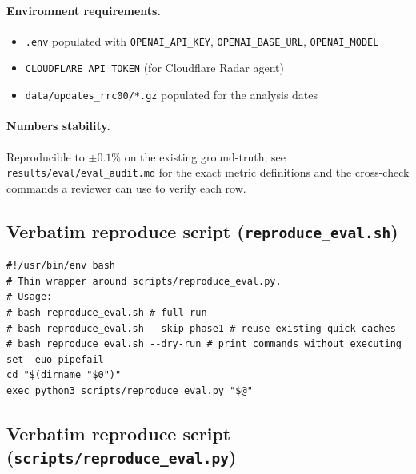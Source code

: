 \documentclass[sigcomm,nonatbib]{acmart}
\begin{document}
\paragraph{Environment requirements.}
\begin{itemize}
\item \texttt{.env} populated with \texttt{OPENAI\_API\_KEY},
\texttt{OPENAI\_BASE\_URL}, \texttt{OPENAI\_MODEL}
\item \texttt{CLOUDFLARE\_API\_TOKEN} (for Cloudflare Radar agent)
\item \texttt{data/updates\_rrc00/*.gz} populated for the analysis
dates
\end{itemize}

\paragraph{Numbers stability.} Reproducible to $\pm 0.1\%$ on the
existing ground-truth; see \texttt{results/eval/eval\_audit.md} for
the exact metric definitions and the cross-check commands a reviewer
can use to verify each row.

\subsection{Verbatim reproduce script (\texttt{reproduce\_eval.sh})}

\begin{verbatim}
#!/usr/bin/env bash
# Thin wrapper around scripts/reproduce_eval.py.
# Usage:
# bash reproduce_eval.sh # full run
# bash reproduce_eval.sh --skip-phase1 # reuse existing quick caches
# bash reproduce_eval.sh --dry-run # print commands without executing
set -euo pipefail
cd "$(dirname "$0")"
exec python3 scripts/reproduce_eval.py "$@"
\end{verbatim}

\subsection{Verbatim reproduce script (\texttt{scripts/reproduce\_eval.py})}
\end{document}
